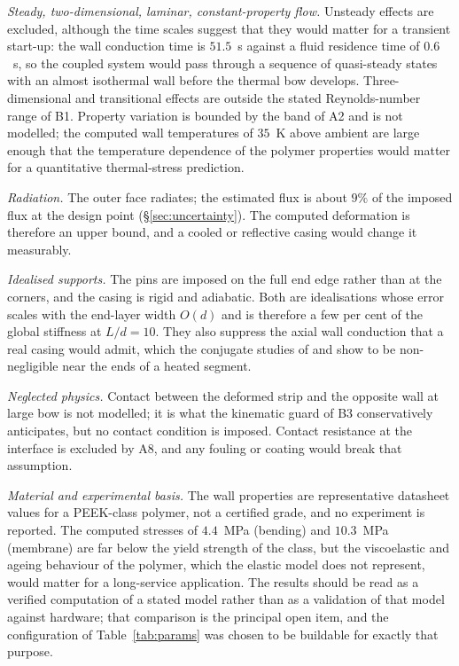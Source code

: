 \documentclass[11pt,a4paper]{article}
\begin{document}
\emph{Steady, two-dimensional, laminar, constant-property flow.} Unsteady
effects are excluded, although the time scales suggest that they would matter
for a transient start-up: the wall conduction time is $51.5$~s against a fluid
residence time of $0.6$~s, so the coupled system would pass through a sequence
of quasi-steady states with an almost isothermal wall before the thermal bow
develops. Three-dimensional and transitional effects are outside the stated
Reynolds-number range of B1. Property variation is bounded by the band of A2
and is not modelled; the computed wall temperatures of $35$~K above ambient
are large enough that the temperature dependence of the polymer properties
would matter for a quantitative thermal-stress prediction.

\emph{Radiation.} The outer face radiates; the estimated flux is about $9\%$
of the imposed flux at the design point (\S\ref{sec:uncertainty}). The
computed deformation is therefore an upper bound, and a cooled or reflective
casing would change it measurably.

\emph{Idealised supports.} The pins are imposed on the full end edge rather
than at the corners, and the casing is rigid and adiabatic. Both are
idealisations whose error scales with the end-layer width $O(d)$ and is
therefore a few per cent of the global stiffness at $L/d=10$. They also
suppress the axial wall conduction that a real casing would admit, which the
conjugate studies of \citet{hassab2013effect} and \citet{arici2010heat} show
to be non-negligible near the ends of a heated segment.

\emph{Neglected physics.} Contact between the deformed strip and the opposite
wall at large bow is not modelled; it is what the kinematic guard of B3
conservatively anticipates, but no contact condition is imposed. Contact
resistance at the interface is excluded by A8, and any fouling or coating
would break that assumption.

\emph{Material and experimental basis.} The wall properties are representative
datasheet values for a PEEK-class polymer, not a certified grade, and no
experiment is reported. The computed stresses of $4.4$~MPa (bending) and
$10.3$~MPa (membrane) are far below the yield strength of the class, but the
viscoelastic and ageing behaviour of the polymer, which the elastic model does
not represent, would matter for a long-service application. The results should
be read as a verified computation of a stated model rather than as a
validation of that model against hardware; that comparison is the principal
open item, and the configuration of Table~\ref{tab:params} was chosen to be
buildable for exactly that purpose.
\end{document}
